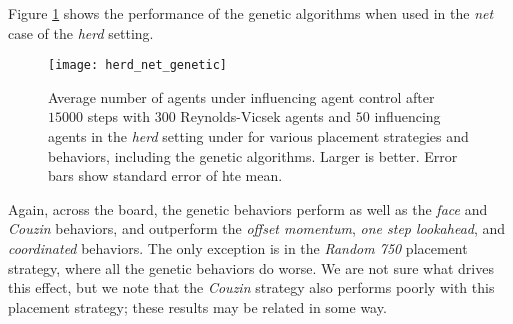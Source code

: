 
Figure \ref{fig:herdnetgenetic} shows the performance of the genetic algorithms
when used in the \textit{net} case of the \textit{herd} setting.
\begin{figure}
    \centering
    \texttt{[image: herd\_net\_genetic]}
    \caption{Average number of agents under influencing agent control after $15000$
    steps with $300$ Reynolds-Vicsek agents and $50$ influencing agents in the
    \textit{herd} setting under for various placement strategies and behaviors,
    including the genetic algorithms.
    Larger is better.
    Error bars show standard error of hte mean.}
    \label{fig:herdnetgenetic}
\end{figure}
Again, across the board, the genetic behaviors perform as well as the
\textit{face} and \textit{Couzin} behaviors, and outperform the \textit{offset
momentum}, \textit{one step lookahead}, and \textit{coordinated} behaviors.
The only exception is in the \textit{Random 750} placement strategy, where all
the genetic behaviors do worse.
We are not sure what drives this effect, but we note that the \textit{Couzin}
strategy also performs poorly with this placement strategy; these results may
be related in some way.
